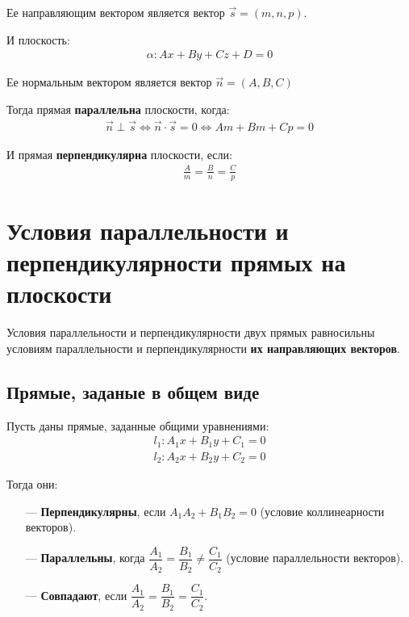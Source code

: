 \documentclass[a4paper,12pt]{extbook}
\theoremstyle{named}
\theoremstyle{named}
\begin{document}
Ее направляющим вектором является вектор \(\overrightarrow{s} = (m, n, p)\).

И плоскость:
\begin{gather*}
    \alpha: Ax + By + Cz + D = 0
\end{gather*}

Ее нормальным вектором является вектор \(\overrightarrow{n} = (A, B, C)\)

Тогда прямая \textbf{параллельна} плоскости, когда:
\begin{gather*}
    \overrightarrow{n} \perp \overrightarrow{s} \iff \overrightarrow{n} \cdot \overrightarrow{s} = 0 \iff Am + Bm + Cp = 0
\end{gather*}

И прямая \textbf{перпендикулярна} плоскости, если:
\begin{gather*}
    \frac{A}{m} = \frac{B}{n} = \frac{C}{p}
\end{gather*}



\section{Условия параллельности и перпендикулярности прямых на плоскости}
\label{sec:parallel_perpendicular_lines}

Условия параллельности и перпендикулярности двух прямых равносильны условиям параллельности и перпендикулярности \textbf{их направляющих векторов}.

\subsection*{Прямые, заданые в общем виде}
Пусть даны прямые, заданные общими уравнениями:
\begin{gather*}
    l_1: A_1x + B_1y + C_1 = 0 \\
    l_2: A_2x + B_2y + C_2 = 0
\end{gather*}

Тогда они:
\begin{itemize}
    \item[—]{\textbf{Перпендикулярны}, если \(A_1A_2 + B_1B_2 = 0\) (условие коллинеарности векторов).}
    \item[—]{\textbf{Параллельны}, когда \(\dfrac{A_1}{A_2} = \dfrac{B_1}{B_2} \neq \dfrac{C_1}{C_2}\) (условие параллельности векторов).}
    \item[—]{\textbf{Совпадают}, если \(\dfrac{A_1}{A_2} = \dfrac{B_1}{B_2} = \dfrac{C_1}{C_2}\).}
\end{itemize}
\end{document}
